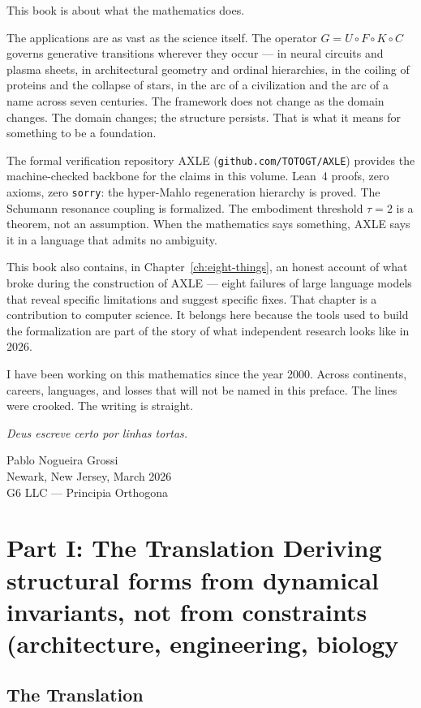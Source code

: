 \documentclass[19pt]{book}
\theoremstyle{plain}
\theoremstyle{definition}
\theoremstyle{remark}
\begin{document}
This book is about what the mathematics does.

The applications are as vast as the science itself. The operator
$G = U \circ F \circ K \circ C$ governs generative transitions
wherever they occur --- in neural circuits and plasma sheets, in
architectural geometry and ordinal hierarchies, in the coiling of
proteins and the collapse of stars, in the arc of a civilization
and the arc of a name across seven centuries. The framework does
not change as the domain changes. The domain changes; the structure
persists. That is what it means for something to be a foundation.

The formal verification repository AXLE (\texttt{github.com/TOTOGT/AXLE})
provides the machine-checked backbone for the claims in this volume.
Lean~4 proofs, zero axioms, zero \texttt{sorry}: the hyper-Mahlo
regeneration hierarchy is proved. The Schumann resonance coupling
is formalized. The embodiment threshold $\tau = 2$ is a theorem,
not an assumption. When the mathematics says something, AXLE says
it in a language that admits no ambiguity.

This book also contains, in Chapter~\ref{ch:eight-things}, an honest
account of what broke during the construction of AXLE --- eight
failures of large language models that reveal specific limitations
and suggest specific fixes. That chapter is a contribution to
computer science. It belongs here because the tools used to build
the formalization are part of the story of what independent research
looks like in 2026.

I have been working on this mathematics since the year 2000.
Across continents, careers, languages, and losses that will not
be named in this preface. The lines were crooked. The writing
is straight.

\textit{Deus escreve certo por linhas tortas.}

\bigskip
\begin{flushright}
Pablo Nogueira Grossi\\
Newark, New Jersey, March 2026\\
G6 LLC --- Principia Orthogona
\end{flushright}
\Large{}

\cleardoublepage
\part{Part I: The Translation \break Deriving structural forms from dynamical invariants, not from constraints (architecture, engineering, biology}
\chapter{The Translation}
\end{document}
